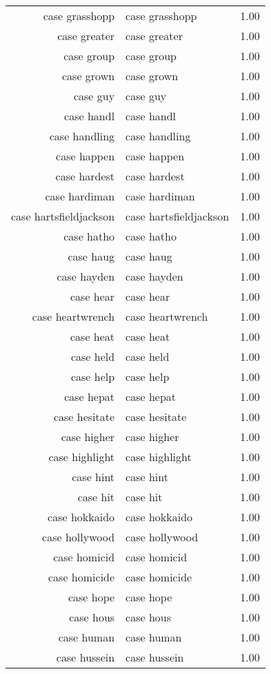 \begin{table}[ht]
\begin{tabular}{rlr}
  case grasshopp & case grasshopp & 1.00 \\ 
  case greater & case greater & 1.00 \\ 
  case group & case group & 1.00 \\ 
  case grown & case grown & 1.00 \\ 
  case guy & case guy & 1.00 \\ 
  case handl & case handl & 1.00 \\ 
  case handling & case handling & 1.00 \\ 
  case happen & case happen & 1.00 \\ 
  case hardest & case hardest & 1.00 \\ 
  case hardiman & case hardiman & 1.00 \\ 
  case hartsfieldjackson & case hartsfieldjackson & 1.00 \\ 
  case hatho & case hatho & 1.00 \\ 
  case haug & case haug & 1.00 \\ 
  case hayden & case hayden & 1.00 \\ 
  case hear & case hear & 1.00 \\ 
  case heartwrench & case heartwrench & 1.00 \\ 
  case heat & case heat & 1.00 \\ 
  case held & case held & 1.00 \\ 
  case help & case help & 1.00 \\ 
  case hepat & case hepat & 1.00 \\ 
  case hesitate & case hesitate & 1.00 \\ 
  case higher & case higher & 1.00 \\ 
  case highlight & case highlight & 1.00 \\ 
  case hint & case hint & 1.00 \\ 
  case hit & case hit & 1.00 \\ 
  case hokkaido & case hokkaido & 1.00 \\ 
  case hollywood & case hollywood & 1.00 \\ 
  case homicid & case homicid & 1.00 \\ 
  case homicide & case homicide & 1.00 \\ 
  case hope & case hope & 1.00 \\ 
  case hous & case hous & 1.00 \\ 
  case human & case human & 1.00 \\ 
  case hussein & case hussein & 1.00 \\ 

\end{tabular}
\end{table}
